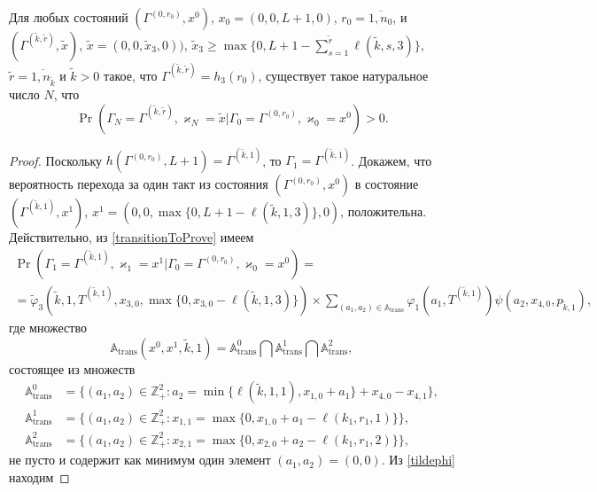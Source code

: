 \documentclass[a4paper,12pt,russian]{extarticle}
\begin{document}
\begin{lemma}
Для любых состояний $(\Gamma^{(0,r_0)},x^0)$, $x_0=(0,0,L+1,0)$, $r_0=\overline{1,n_0}$, и
$(\Gamma^{(\tilde{k},\tilde{r})},\tilde{x})$,
$\tilde{x}=(0,0,\tilde{x}_3,0))$, $\tilde{x}_3\geqslant\max{\{0,L+1-\sum_{s=1}^{\tilde{r}} \ell(\tilde{k},s,3)\}}$,
$\tilde{r} = \overline{1,n_{\tilde{k}}}$ 
и $\tilde{k}>0$ такое, что 
$\Gamma^{(\tilde{k},\tilde{r})}=h_3(r_0)$, существует такое натуральное число $N$, что 
\begin{equation*}
\Pr(\Gamma_{N}=\Gamma^{(\tilde{k},\tilde{r} )}, \varkappa_{N}=\tilde{x}|
\Gamma_{0}=\Gamma^{(0,r_0)}, \varkappa_{0}=x^0)>0.
\end{equation*}
\label{incycle:states}
\end{lemma}
\begin{proof}
Поскольку $h(\Gamma^{(0,r_0)}, L+1) = \Gamma^{(\tilde{k},1)}$, то $\Gamma_1 = \Gamma^{(\tilde{k},1)}$. Докажем, что вероятность перехода за один такт из состояния $(\Gamma^{(0,r_0)},x^0)$ в состояние $(\Gamma^{(\tilde{k},1)},x^1)$, $x^1 = (0,0,\max{\{0,L+1-\ell(\tilde{k},1,3)\}},0)$, положительна.
Действительно, из \eqref{transitionToProve} имеем
\begin{multline*}
\Pr(\Gamma_{1}=\Gamma^{(\tilde{k},1)}, \varkappa_{1}=x^1|
\Gamma_{0}=\Gamma^{(0,r_0)}, \varkappa_{0}=x^0)=\\
=\widetilde{\varphi}_3(\tilde{k},1,T^{(\tilde{k},1)},x_{3,0},\max{\{0,x_{3,0} - \ell(\tilde{k},1,3)\}}) \times
\sum_{(a_1,a_2)\in {\mathbb A}_{\mathrm{trans}}}\varphi_1(a_1,T^{(\tilde{k},1)})  \psi(a_2,x_{4,0}, p_{\tilde{k},1}),
\end{multline*}
где множество 
\begin{equation*}
{\mathbb A}_{\mathrm{trans}}(x^0,x^1,\tilde{k},1) = {\mathbb A}_{\mathrm{trans}}^0 \bigcap {\mathbb A}_{\mathrm{trans}}^1\bigcap {\mathbb A}_{\mathrm{trans}}^2,
\end{equation*}
состоящее из множеств 
\begin{align*}
{\mathbb A}_{\mathrm{trans}}^0 &= \{(a_1,a_2) \in \mathbb{Z}_+^2 \colon a_2 = \min{\{\ell(\tilde{k},1,1), x_{1,0}+a_1}\} +x_{4,0}- x_{4,1}\},\\
{\mathbb A}_{\mathrm{trans}}^1 &= \{(a_1,a_2) \in \mathbb{Z}_+^2 \colon x_{1,1}=\max{\{0,x_{1,0}+a_1-\ell(k_1,r_1,1)\}}\},\\
 {\mathbb A}_{\mathrm{trans}}^2 &= \{(a_1,a_2) \in \mathbb{Z}_+^2 \colon  x_{2,1} =\max{\{0,x_{2,0}+a_2-\ell(k_1,r_1,2)\}}\},
\end{align*}
не пусто и содержит как минимум один элемент $(a_1,a_2)=(0,0)$. Из \eqref{tildephi} находим

\end{proof}
\end{document}
